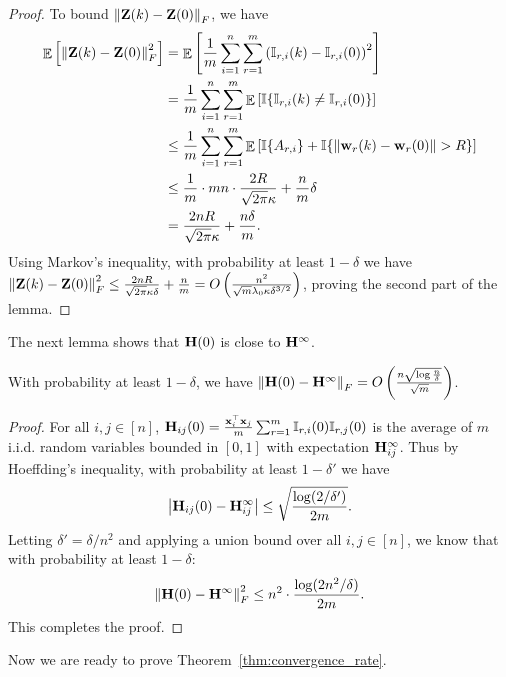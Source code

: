 \begin{proof}
	To bound $\left\|\mathbf{Z}(k) - \mathbf{Z}(0)\right\|_F$, we have
	\begin{align*}
	\mathop\mathbb{E}\left[ \left\|\mathbf{Z}(k) - \mathbf{Z}(0)\right\|_F^2 \right]
	&=  \mathop\mathbb{E}\left[ \frac1m \sum_{i=1}^n \sum_{r=1}^m \left( \mathbb{I}_{r, i}(k) - \mathbb{I}_{r, i}(0) \right)^2  \right]\\
	&= \frac1m  \sum_{i=1}^n \sum_{r=1}^m \mathop\mathbb{E}\left[  \mathbb{I}\{ \mathbb{I}_{r, i}(k) \not= \mathbb{I}_{r, i}(0) \}  \right]\\
	&\le \frac1m  \sum_{i=1}^n \sum_{r=1}^m \mathop\mathbb{E}\left[  \mathbb{I}\{ A_{r, i} \} + \mathbb{I}\{ \left\|\mathbf{w}_r(k) - \mathbf{w}_r(0)\right\| > R \}  \right]\\
	&\le \frac1m \cdot mn \cdot \frac{2R}{\sqrt{2\pi}\kappa} + \frac nm \delta\\
	&= \frac{2nR}{\sqrt{2\pi}\kappa} + \frac{n\delta}{m}.
	\end{align*}
	Using Markov's inequality, with probability at least $1-\delta$ we have $\left\|\mathbf{Z}(k) - \mathbf{Z}(0)\right\|_F^2 \le \frac{2nR}{\sqrt{2\pi}\kappa\delta} + \frac nm = O\left( \frac{n^{2}  }{\sqrt m \lambda_0\kappa\delta^{3/2}} \right)$,
	proving the second part of the lemma.
\end{proof}


The next lemma shows that $\mathbf{H}(0)$ is close to $\mathbf{H}^\infty$.

\begin{lem} \label{lem:H(0)-H^inf}
	With probability at least $1-\delta$, we have $\left\|\mathbf{H}(0) - \mathbf{H}^\infty\right\|_F = O\left( \frac{n\sqrt{\log \frac{n}{\delta}}}{\sqrt m} \right)$.
\end{lem}
\begin{proof}
	For all $i, j \in[n]$, $\mathbf{H}_{ij}(0) = \frac{\mathbf{x}_i^\top \mathbf{x}_j}{m} \sum_{r=1}^{m}\mathbb{I}_{r,i}(0)\mathbb{I}_{r,j}(0)$ is the average of $m$ i.i.d. random variables bounded in $[0, 1]$ with expectation $\mathbf{H}^\infty_{ij}$.
	Thus by Hoeffding's inequality, with probability at least $1-\delta'$ we have
	$$\left| \mathbf{H}_{ij}(0) - \mathbf{H}^\infty_{ij} \right| \le \sqrt{\frac{\log ({2}/{\delta'})}{2m}}.$$
	Letting $\delta' = \delta/n^2$ and applying a union bound over all $i, j \in [n]$, we know that with probability at least $1-\delta$:
	\begin{align*}
	\left\|\mathbf{H}(0) - \mathbf{H}^\infty\right\|_F^2 \le n^2 \cdot \frac{\log (2n^2/\delta)}{2m}.
	\end{align*}
	This completes the proof.
\end{proof}



Now we are ready to prove Theorem~\ref{thm:convergence_rate}.

